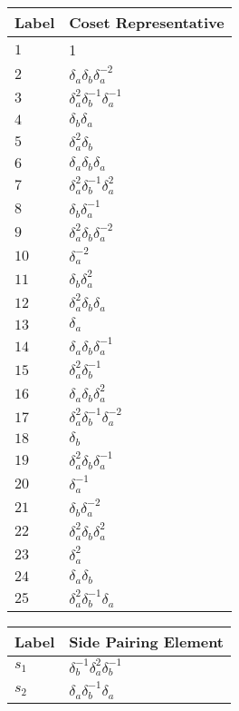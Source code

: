 \documentclass{article}
\begin{document}

\begin{center}
\begin{tabular}{ll}
\toprule
Label & Coset Representative\\
\midrule
$1$ & 1 \\
$2$ & $\delta_a^{}\delta_b^{}\delta_a^{-2}$ \\
$3$ & $\delta_a^{2}\delta_b^{-1}\delta_a^{-1}$ \\
$4$ & $\delta_b^{}\delta_a^{}$ \\
$5$ & $\delta_a^{2}\delta_b^{}$ \\
$6$ & $\delta_a^{}\delta_b^{}\delta_a^{}$ \\
$7$ & $\delta_a^{2}\delta_b^{-1}\delta_a^{2}$ \\
$8$ & $\delta_b^{}\delta_a^{-1}$ \\
$9$ & $\delta_a^{2}\delta_b^{}\delta_a^{-2}$ \\
$10$ & $\delta_a^{-2}$ \\
$11$ & $\delta_b^{}\delta_a^{2}$ \\
$12$ & $\delta_a^{2}\delta_b^{}\delta_a^{}$ \\
$13$ & $\delta_a^{}$ \\
$14$ & $\delta_a^{}\delta_b^{}\delta_a^{-1}$ \\
$15$ & $\delta_a^{2}\delta_b^{-1}$ \\
$16$ & $\delta_a^{}\delta_b^{}\delta_a^{2}$ \\
$17$ & $\delta_a^{2}\delta_b^{-1}\delta_a^{-2}$ \\
$18$ & $\delta_b^{}$ \\
$19$ & $\delta_a^{2}\delta_b^{}\delta_a^{-1}$ \\
$20$ & $\delta_a^{-1}$ \\
$21$ & $\delta_b^{}\delta_a^{-2}$ \\
$22$ & $\delta_a^{2}\delta_b^{}\delta_a^{2}$ \\
$23$ & $\delta_a^{2}$ \\
$24$ & $\delta_a^{}\delta_b^{}$ \\
$25$ & $\delta_a^{2}\delta_b^{-1}\delta_a^{}$ \\
\bottomrule
\end{tabular}
\hfill
\begin{tabular}{ll}
\toprule
Label & Side Pairing Element\\
\midrule
$s_{1}$ & $\delta_b^{-1}\delta_a^{2}\delta_b^{-1}$ \\
$s_{2}$ & $\delta_a^{}\delta_b^{-1}\delta_a^{}$ \\

\end{tabular}
\end{center}
\end{document}
